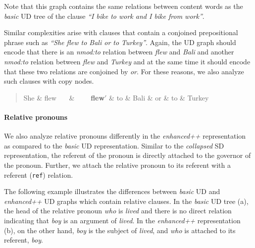 \documentclass[10pt, a4paper]{article}
\begin{document}
Note that this graph contains the same 
relations between content words as the \textit{basic} UD tree of the clause 
\textit{``I bike to work and I bike from work''}.

Similar complexities arise with clauses that contain a conjoined prepositional phrase such as 
\textit{``She flew to Bali or to Turkey''}. Again, the UD graph should encode
that there is an \textit{nmod:to} relation between \textit{flew} and \textit{Bali}
and another \textit{nmod:to} relation between \textit{flew} and \textit{Turkey} and
at the same time it should encode that these two relations are conjoined by \textit{or}.
For these reasons, we also analyze such clauses with copy nodes.

\begin{quote}
\begin{center}
\begin{dependency}[column sep=0.2em, edge unit distance=2.25ex]
  \begin{deptext}
    She \& flew \ \ \  \& \ \ \ \ \textbf{flew$'$} \& to \& Bali \& or \& to \& Turkey \\
  \end{deptext}
\end{dependency}
\end{center}
\end{quote}


\paragraph{Relative pronouns} We also analyze relative pronouns differently 
in the \textit{enhanced++} representation as compared to the \textit{basic} UD
representation. Similar to the \textit{collapsed} SD representation, the referent of 
the pronoun is directly attached to the governor of the pronoun.
Further, we attach the relative pronoun to its referent with a referent (\texttt{ref})
relation.

The following example illustrates the differences between \textit{basic} UD and \textit{enhanced++}
UD graphs which contain relative clauses. In the \textit{basic} UD tree (a), the head of the relative pronoun
\textit{who} is \textit{lived} and there is no direct relation indicating that \textit{boy} is an argument of \textit{lived}. 
In the \textit{enhanced++} representation (b), on the other hand, \textit{boy} is the subject of \textit{lived}, 
and \textit{who} is attached to its referent, \textit{boy}.
\end{document}
